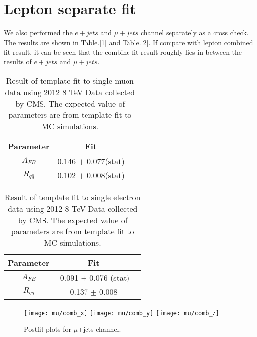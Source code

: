 \documentclass{cmspaperpdf}
\begin{document}
\clearpage
\section{Lepton separate fit}
\label{lep seperate fit}

We also performed the $e+jets$ and $\mu+jets$ channel separately as a cross check. The results are shown in Table.[\ref{tab:result_mu}] and Table.[\ref{tab:result_el}]. If compare with lepton combined fit result, it can be seen that the combine fit result roughly lies in between the results of $e+jets$ and $\mu+jets$. 

\begin{table}[hbt]
\begin{center}
\begin{tabular}{c|cc}\hline
Parameter                   & Fit   \\
\hline
$A_{FB}$					   &  0.146 $\pm$ 0.077(stat)  \\
$R_{q\bar{q}}$			  &  0.102 $\pm$ 0.008(stat)  \\
\end{tabular}
\end{center}
\label{tab:result_mu}
\caption{Result of template fit to single muon data using 2012 8 TeV Data collected by CMS.  The expected value of parameters are from template fit to MC simulations. }
\end{table}

\begin{table}[hbt]
\begin{center}
\begin{tabular}{c|cc}\hline
Parameter                   & Fit   \\
\hline
$A_{FB}$						& -0.091  $\pm$ 0.076 (stat) \\
$R_{q\bar{q}}$ & 0.137 $\pm$ 0.008   \\
\end{tabular}
\end{center}
\label{tab:result_el}
\caption{Result of template fit to single electron data using 2012 8 TeV Data collected by CMS. The expected value of parameters are from template fit to MC simulations. }
\end{table}

\begin{figure}[hbt]
  \begin{center}
    \texttt{[image: mu/comb\_x]}
    \texttt{[image: mu/comb\_y]}
    \texttt{[image: mu/comb\_z]}
  \caption{\small Postfit plots for $\mu$+jets channel.}
    \label{fig:mu_postfit}
  \end{center}
\end{figure}
\end{document}

